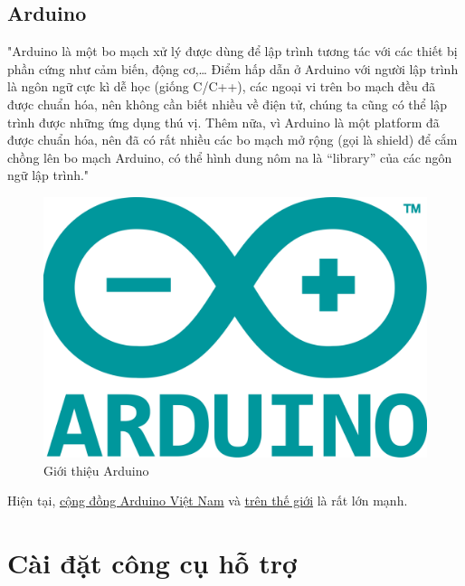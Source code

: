 \subsection{Arduino}
"Arduino là một bo mạch xử lý được dùng để lập trình tương tác với các thiết bị phần cứng như cảm biến, động cơ,… Điểm hấp dẫn ở Arduino với người lập trình là ngôn ngữ cực kì dễ học (giống C/C++), các ngoại vi trên bo mạch đều đã được chuẩn hóa, nên không cần biết nhiều về điện tử, chúng ta cũng có thể lập trình được những ứng dụng thú vị. Thêm nữa, vì Arduino là một platform đã được chuẩn hóa, nên đã có rất nhiều các bo mạch mở rộng (gọi là shield) để cắm chồng lên bo mạch Arduino, có thể hình dung nôm na là “library” của các ngôn ngữ lập trình." \cite{tl16}\\
\begin{center}
\begin{figure}[htp]
\begin{center}
\includegraphics[scale=0.1]{image4/arduinologo.png}
\end{center}
\caption{Giới thiệu Arduino}
\end{figure}
\end{center}
\newpage
Hiện tại, \href{http://arduino.vn/}{cộng đồng Arduino Việt Nam} và \href{https://www.arduino.cc/}{trên thế giới} là rất lớn mạnh. 

\section{Cài đặt công cụ hỗ trợ}
